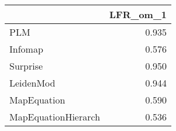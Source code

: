 \begin{tabular}{lr}
\toprule
{} & LFR_om_1 \\
\midrule
PLM                 &    0.935 \\
Infomap             &    0.576 \\
Surprise            &    0.950 \\
LeidenMod           &    0.944 \\
MapEquation         &    0.590 \\
MapEquationHierarch &    0.536 \\
\bottomrule
\end{tabular}
